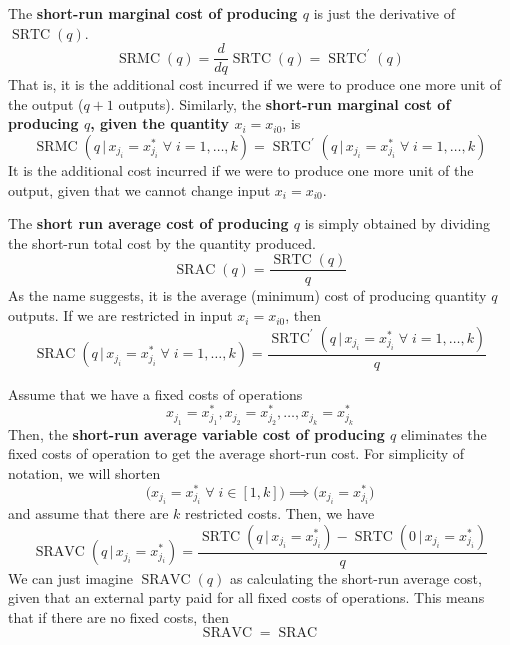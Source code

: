 \documentclass{article}
\DeclareMathOperator{\SRTC}{SRTC}
\DeclareMathOperator{\SRMC}{SRMC}
\DeclareMathOperator{\SRAC}{SRAC}
\DeclareMathOperator{\SRAVC}{SRAVC}
\begin{document}
      \begin{definition}
        The \textbf{short-run marginal cost of producing $q$} is just the derivative of $\SRTC(q)$. 
        \[\SRMC(q) = \frac{d}{dq} \SRTC(q) = \SRTC^\prime (q)\]
        That is, it is the additional cost incurred if we were to produce one more unit of the output ($q+1$ outputs). Similarly, the \textbf{short-run marginal cost of producing $q$, given the quantity $x_i = x_{i0}$}, is 
        \[\SRMC(q\,|\, x_{j_i} = x_{j_i}^* \;\forall\; i = 1, \ldots, k) = \SRTC^\prime (q\,|\, x_{j_i} = x_{j_i}^* \;\forall\; i = 1, \ldots, k)\]
        It is the additional cost incurred if we were to produce one more unit of the output, given that we cannot change input $x_i = x_{i0}$. 
      \end{definition}

      \begin{definition}
        The \textbf{short run average cost of producing $q$} is simply obtained by dividing the short-run total cost by the quantity produced. 
        \[\SRAC (q) = \frac{\SRTC(q)}{q}\]
        As the name suggests, it is the average (minimum) cost of producing quantity $q$ outputs. If we are restricted in input $x_i = x_{i0}$, then 
        \[\SRAC(q\,|\, x_{j_i} = x_{j_i}^* \;\forall\; i = 1, \ldots, k) = \frac{\SRTC^\prime (q\,|\, x_{j_i} = x_{j_i}^* \;\forall\; i = 1, \ldots, k)}{q}\]
      \end{definition}

      \begin{definition}
        Assume that we have a fixed costs of operations 
        \[x_{j_1} = x_{j_1}^*, x_{j_2} = x_{j_2}^*, \ldots, x_{j_k} = x_{j_k}^*\] 
        Then, the \textbf{short-run average variable cost of producing $q$} eliminates the fixed costs of operation to get the average short-run cost. For simplicity of notation, we will shorten 
        \[\big( x_{j_i} = x_{j_i}^* \;\forall\; i \in [1,k]\big) \implies \big(  x_{j_i} = x_{j_i}^*  \big)\]
        and assume that there are $k$ restricted costs. Then, we have 
        \[\SRAVC(q\,|\, x_{j_i} = x_{j_i}^*) = \frac{\SRTC(q\,|\, x_{j_i} = x_{j_i}^*) - \SRTC(0\,|\, x_{j_i} = x_{j_i}^*)}{q}\]
        We can just imagine $\SRAVC(q)$ as calculating the short-run average cost, given that an external party paid for all fixed costs of operations. This means that if there are no fixed costs, then 
        \[\SRAVC = \SRAC\]
      \end{definition}
\end{document}

